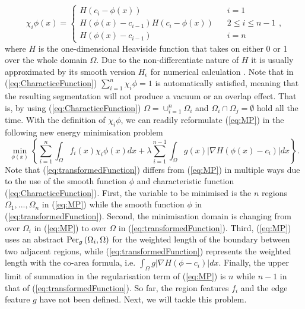 \documentclass[runningheads,a4paper]{llncs}
\begin{document}
\begin{equation} \label{eq:CharacticeFunction}
{\chi _i}\phi(x)  = \left\{ \begin{array}{lc}
H\left( {{c_i} - \phi(x) } \right) \;\;\; &i=1\\
H\left( {\phi(x)  - {c_{i - 1}}} \right)H\left( {{c_i} - \phi(x) } \right) \;\;\; & 2 \le i \le n-1\\
H\left( {\phi(x)  - {c_{i - 1}}} \right) \;\;\; &i=n
\end{array} \right.,
\end{equation}
where $H$ is the one-dimensional Heaviside function that takes on either 0 or 1 over the whole domain $\Omega$. Due to the non-differentiate nature of $H$ it is usually approximated by its smooth version $H_\epsilon$ for numerical calculation \cite{chung2009image}. Note that in (\ref{eq:CharacticeFunction}) $\sum\nolimits_{i = 1}^n {{\chi _i}\phi = 1}$ is automatically satisfied, meaning that the resulting segmentation will not produce a vacuum or an overlap effect. That is, by using (\ref{eq:CharacticeFunction}) $\Omega  =  \cup _{i = 1}^n{\Omega _i}$ and ${\Omega _i} \cap {\Omega _j} = \emptyset$ hold all the time. With the definition of ${\chi _i}\phi$, we can readily reformulate (\ref{eq:MP}) in the following new energy minimisation problem 
\begin{equation} \label{eq:transformedFunction}
\mathop {\min }\limits_{\phi(x)}  \left\{ {\sum\limits_{i = 1}^n {\int_\Omega  {{f_i}\left( x \right){\chi _i}\phi \left( x \right)dx} }  + \lambda \sum\limits_{i = 1}^{n - 1} {\int_\Omega  {g\left( x \right)\left| {\nabla H\left( {\phi \left( x \right) - {c_{i }}} \right)} \right|dx} } } \right\}.
\end{equation}
Note that (\ref{eq:transformedFunction}) differs from (\ref{eq:MP}) in multiple ways due to the use of the smooth function $\phi$ and characteristic function (\ref{eq:CharacticeFunction}). First, the variable to be minimised is the $n$ regions ${\Omega _1},...,{\Omega _n}$ in (\ref{eq:MP}) while the smooth function $\phi$ in (\ref{eq:transformedFunction}). Second, the minimisation domain is changing from over $\Omega_i$ in (\ref{eq:MP}) to over $\Omega$ in (\ref{eq:transformedFunction}). Third, (\ref{eq:MP}) uses an abstract ${{\rm{Pe}}{{\rm{r}}_g}\left( {{\Omega _i},\Omega } \right)}$ for the weighted length of the boundary between two adjacent regions, while (\ref{eq:transformedFunction}) represents the weighted length with the co-area formula, i.e. ${\int_\Omega  {g\left| {\nabla H\left( {\phi - {c_i}} \right)} \right|dx} }$. Finally, the upper limit of summation in the regularisation term of (\ref{eq:MP}) is $n$ while $n-1$ in that of (\ref{eq:transformedFunction}). So far, the region features $f_i$ and the edge feature $g$ have not been defined. Next, we will tackle this problem.\\
\end{document}
